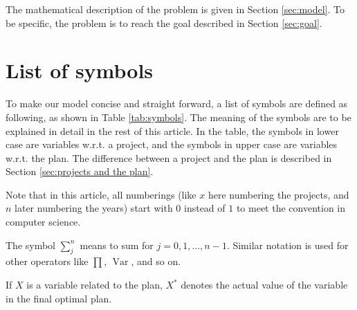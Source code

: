 \documentclass{article}
\DeclareMathOperator*{\var}{Var}
\begin{document}

The mathematical description of the problem is given in Section \ref{sec:model}.
To be specific, the problem is to reach the goal described in Section \ref{sec:goal}.

\section{List of symbols}

To make our model concise and straight forward, a list of symbols are defined as following, as shown in Table \ref{tab:symbols}.
The meaning of the symbols are to be explained in detail in the rest of this article.
In the table, the symbols in lower case are variables w.r.t. a project,
and the symbols in upper case are variables w.r.t. the plan.
The difference between a project and the plan is described in Section \ref{sec:projects and the plan}.

Note that in this article, all numberings
(like $x$ here numbering the projects, and $n$ later numbering the years)
start with $0$ instead of $1$ to meet the convention in computer science.

The symbol $\sum_j^n$ means to sum for $j=0,1,\dots,n-1$.
Similar notation is used for other operators like $\prod$, $\var$, and so on.

If $X$ is a variable related to the plan, $X^*$ denotes the actual value of the variable in the final optimal plan.
\end{document}
